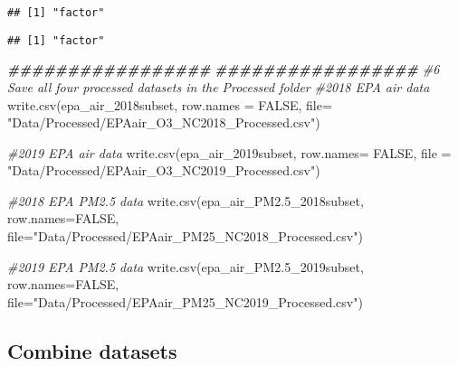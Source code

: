 \documentclass[
]{article}
\newenvironment{Shaded}{\begin{snugshade}}{\end{snugshade}}
\newcommand{\AttributeTok}[1]{\textcolor[rgb]{0.77,0.63,0.00}{#1}}
\newcommand{\CommentTok}[1]{\textcolor[rgb]{0.56,0.35,0.01}{\textit{#1}}}
\newcommand{\ConstantTok}[1]{\textcolor[rgb]{0.00,0.00,0.00}{#1}}
\newcommand{\DocumentationTok}[1]{\textcolor[rgb]{0.56,0.35,0.01}{\textbf{\textit{#1}}}}
\newcommand{\FloatTok}[1]{\textcolor[rgb]{0.00,0.00,0.81}{#1}}
\newcommand{\FunctionTok}[1]{\textcolor[rgb]{0.00,0.00,0.00}{#1}}
\newcommand{\NormalTok}[1]{#1}
\newcommand{\SpecialCharTok}[1]{\textcolor[rgb]{0.00,0.00,0.00}{#1}}
\newcommand{\StringTok}[1]{\textcolor[rgb]{0.31,0.60,0.02}{#1}}
\begin{document}
\begin{verbatim}
## [1] "factor"
\end{verbatim}

\begin{Shaded}
\end{Shaded}

\begin{verbatim}
## [1] "factor"
\end{verbatim}

\begin{Shaded}
\begin{Highlighting}[]
\DocumentationTok{\#\#\#\#\#\#\#\#\#\#\#\#\#\#\#\#\#}
\DocumentationTok{\#\#\#\#\#\#\#\#\#\#\#\#\#\#\#\#\#}
\CommentTok{\#6 Save all four processed datasets in the Processed folder}
\CommentTok{\#2018 EPA air data}
\FunctionTok{write.csv}\NormalTok{(epa\_air\_2018subset, }\AttributeTok{row.names =} \ConstantTok{FALSE}\NormalTok{, }
          \AttributeTok{file=} \StringTok{"Data/Processed/EPAair\_O3\_NC2018\_Processed.csv"}\NormalTok{)}

\CommentTok{\#2019 EPA air data}
\FunctionTok{write.csv}\NormalTok{(epa\_air\_2019subset, }\AttributeTok{row.names=} \ConstantTok{FALSE}\NormalTok{, }
          \AttributeTok{file =} \StringTok{"Data/Processed/EPAair\_O3\_NC2019\_Processed.csv"}\NormalTok{)}

\CommentTok{\#2018 EPA PM2.5 data}
\FunctionTok{write.csv}\NormalTok{(epa\_air\_PM2}\FloatTok{.5}\NormalTok{\_2018subset, }\AttributeTok{row.names=}\ConstantTok{FALSE}\NormalTok{,}
          \AttributeTok{file=}\StringTok{"Data/Processed/EPAair\_PM25\_NC2018\_Processed.csv"}\NormalTok{)}

\CommentTok{\#2019 EPA PM2.5 data}
\FunctionTok{write.csv}\NormalTok{(epa\_air\_PM2}\FloatTok{.5}\NormalTok{\_2019subset, }\AttributeTok{row.names=}\ConstantTok{FALSE}\NormalTok{, }
          \AttributeTok{file=}\StringTok{"Data/Processed/EPAair\_PM25\_NC2019\_Processed.csv"}\NormalTok{)}
\end{Highlighting}
\end{Shaded}

\hypertarget{combine-datasets}{%
\subsection{Combine datasets}\label{combine-datasets}}
\end{document}
